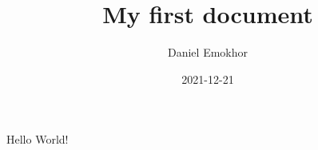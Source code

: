 \documentclass{article}
\title{ My first document}
\date{2021-12-21}
\author{Daniel Emokhor}
\begin{document}
	\maketitle
	\newpage
	Hello World! 
\end{document}

